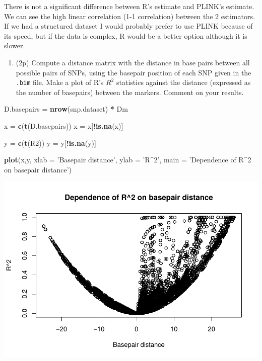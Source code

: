 \documentclass[
]{article}
\newenvironment{Shaded}{\begin{snugshade}}{\end{snugshade}}
\newcommand{\DataTypeTok}[1]{\textcolor[rgb]{0.13,0.29,0.53}{#1}}
\newcommand{\KeywordTok}[1]{\textcolor[rgb]{0.13,0.29,0.53}{\textbf{#1}}}
\newcommand{\NormalTok}[1]{#1}
\newcommand{\OperatorTok}[1]{\textcolor[rgb]{0.81,0.36,0.00}{\textbf{#1}}}
\newcommand{\StringTok}[1]{\textcolor[rgb]{0.31,0.60,0.02}{#1}}
\providecommand{\tightlist}{%
  \setlength{\itemsep}{0pt}\setlength{\parskip}{0pt}}
\begin{document}
There is not a significant difference between R's estimate and PLINK's
estimate. We can see the high linear correlation (1-1 correlation)
between the 2 estimators. If we had a structured dataset I would
probably prefer to use PLINK because of its speed, but if the data is
complex, R would be a better option although it is slower.

\begin{enumerate}
\def\labelenumi{\arabic{enumi}.}
\setcounter{enumi}{7}
\tightlist
\item
  (2p) Compute a distance matrix with the distance in base pairs between
  all possible pairs of SNPs, using the basepair position of each SNP
  given in the \texttt{.bim} file. Make a plot of R's \(R^2\) statistics
  against the distance (expressed as the number of basepairs) between
  the markers. Comment on your results.
\end{enumerate}

\begin{Shaded}
\begin{Highlighting}[]
\NormalTok{D.basepairs =}\StringTok{ }\KeywordTok{nrow}\NormalTok{(snp.dataset) }\OperatorTok{*}\StringTok{ }\NormalTok{Dm}

\NormalTok{x =}\StringTok{ }\KeywordTok{c}\NormalTok{(}\KeywordTok{t}\NormalTok{(D.basepairs))}
\NormalTok{x =}\StringTok{ }\NormalTok{x[}\OperatorTok{!}\KeywordTok{is.na}\NormalTok{(x)]}

\NormalTok{y =}\StringTok{ }\KeywordTok{c}\NormalTok{(}\KeywordTok{t}\NormalTok{(R2))}
\NormalTok{y =}\StringTok{ }\NormalTok{y[}\OperatorTok{!}\KeywordTok{is.na}\NormalTok{(y)]}

\KeywordTok{plot}\NormalTok{(x,y, }\DataTypeTok{xlab =} \StringTok{'Basepair distance'}\NormalTok{, }\DataTypeTok{ylab =} \StringTok{'R^2'}\NormalTok{, }\DataTypeTok{main =} \StringTok{'Dependence of R^2 on basepair distance'}\NormalTok{)}
\end{Highlighting}
\end{Shaded}

\includegraphics{P032020_LD_files/figure-latex/8th-1.pdf}
\end{document}
